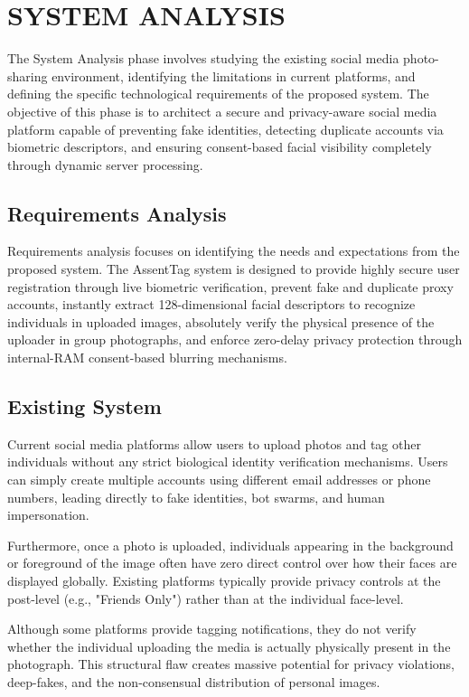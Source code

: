 \chapter{SYSTEM ANALYSIS}

The System Analysis phase involves studying the existing social media photo-sharing environment, identifying the limitations in current platforms, and defining the specific technological requirements of the proposed system. The objective of this phase is to architect a secure and privacy-aware social media platform capable of preventing fake identities, detecting duplicate accounts via biometric descriptors, and ensuring consent-based facial visibility completely through dynamic server processing.

\section{Requirements Analysis}

Requirements analysis focuses on identifying the needs and expectations from the proposed system. The AssentTag system is designed to provide highly secure user registration through live biometric verification, prevent fake and duplicate proxy accounts, instantly extract 128-dimensional facial descriptors to recognize individuals in uploaded images, absolutely verify the physical presence of the uploader in group photographs, and enforce zero-delay privacy protection through internal-RAM consent-based blurring mechanisms.

\section{Existing System}

Current social media platforms allow users to upload photos and tag other individuals without any strict biological identity verification mechanisms. Users can simply create multiple accounts using different email addresses or phone numbers, leading directly to fake identities, bot swarms, and human impersonation.

Furthermore, once a photo is uploaded, individuals appearing in the background or foreground of the image often have zero direct control over how their faces are displayed globally. Existing platforms typically provide privacy controls at the post-level (e.g., "Friends Only") rather than at the individual face-level. 

Although some platforms provide tagging notifications, they do not verify whether the individual uploading the media is actually physically present in the photograph. This structural flaw creates massive potential for privacy violations, deep-fakes, and the non-consensual distribution of personal images.

